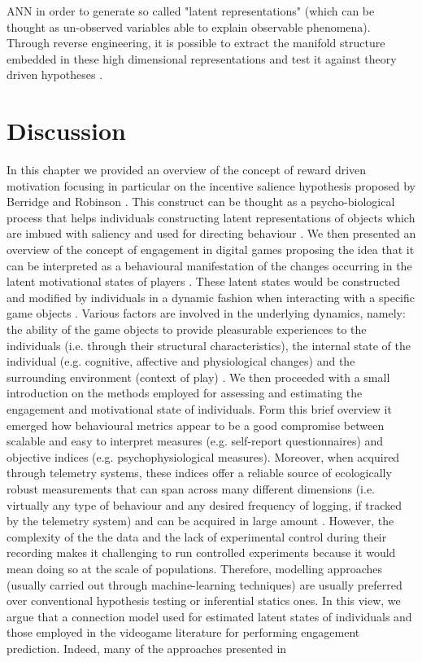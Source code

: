 ANN in order to generate so called "latent representations" (which can be thought as un-observed variables able to explain observable phenomena). Through reverse engineering, it is possible to extract the manifold structure embedded in these high dimensional representations and test it against theory driven hypotheses \cite{barak2017recurrent,kietzmann2018deep}. 

\section{Discussion}
\label{discussion_litreview}
In this chapter we provided an overview of the concept of reward driven motivation focusing in particular on the incentive salience hypothesis proposed by Berridge and Robinson \cite{berridge1998role}. This construct can be thought as a psycho-biological process that helps individuals constructing latent representations of objects which are imbued with saliency and used for directing behaviour \cite{berridge2004motivation}. We then presented an overview of the concept of engagement in digital games proposing the idea that it can be interpreted as a behavioural manifestation of the changes occurring in the latent motivational states of players \cite{o2008user,berridge2004motivation}. These latent states would be constructed and modified by individuals in a dynamic fashion when interacting with a specific game objects \cite{o2008user,berridge2004motivation}. Various factors are involved in the underlying dynamics, namely: the ability of the game objects to provide pleasurable experiences to the individuals (i.e. through their structural characteristics), the internal state of the individual (e.g. cognitive, affective and physiological changes) and the surrounding environment (context of play) \cite{lucas2004sex,o2008user,jennett2008measuring,boyle2012engagement,connolly2012systematic,berridge2004motivation,csikszentmihalyi2014toward}. We then proceeded with a small introduction on the methods employed for assessing and estimating the engagement and motivational state of individuals. Form this brief overview it emerged how behavioural metrics appear to be a good compromise between scalable and easy to interpret measures (e.g. self-report questionnaires) and objective indices (e.g. psychophysiological measures). Moreover, when acquired through telemetry systems, these indices offer a reliable source of ecologically robust measurements that can span across many different dimensions (i.e. virtually any type of behaviour and any desired frequency of logging, if tracked by the telemetry system) and can be acquired in large amount \cite{el2016game}. However, the complexity of the the data and the lack of experimental control during their recording makes it challenging to run controlled experiments because it would mean doing so at the scale of populations. Therefore, modelling approaches (usually carried out through machine-learning techniques) are usually preferred over conventional hypothesis testing or inferential statics ones. In this view, we argue that a connection model used for estimated latent states of individuals and those employed in the videogame literature for performing engagement prediction. Indeed, many of the approaches presented in 